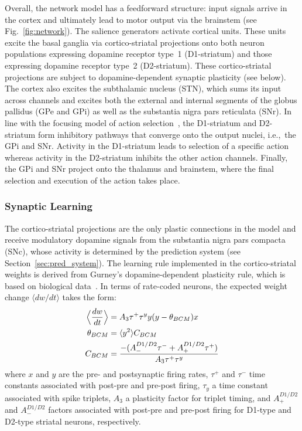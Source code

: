 \documentclass[a4paper]{scrreprt}
\begin{document}
Overall, the network model has a feedforward structure: input signals arrive in the cortex and ultimately lead to motor output via the brainstem (see Fig.~\ref{fig:network}). The salience generators activate cortical units. These units excite the basal ganglia via cortico-striatal projections onto both neuron populations expressing dopamine receptor type~1 (D1-striatum) and those expressing dopamine receptor type~2 (D2-striatum). These cortico-striatal projections are subject to dopamine-dependent synaptic plasticity (see below). The cortex also excites the subthalamic nucleus (STN), which sums its input across channels and excites both the external and internal segments of the globus pallidus (GPe and GPi) as well as the substantia nigra pars reticulata (SNr). In line with the focusing model of action selection~\cite{kandel_basalganglia}, the D1-striatum and D2-striatum form inhibitory pathways that converge onto the output nuclei, i.e.,~the GPi and SNr. Activity in the D1-striatum leads to selection of a specific action whereas activity in the D2-striatum inhibits the other action channels. Finally, the GPi and SNr project onto the thalamus and brainstem, where the final selection and execution of the action takes place.

\subsubsection{Synaptic Learning}

The cortico-striatal projections are the only plastic connections in the model and receive modulatory dopamine signals from the substantia nigra pars compacta (SNc), whose activity is determined by the prediction system (see Section~\ref{sec:pred_system}). The learning rule implemented in the cortico-striatal weights is derived from Gurney's dopamine-dependent plasticity rule, which is based on biological data~\cite{shen08}. In terms of rate-coded neurons, the expected weight change $\langle dw / dt \rangle$ takes the form:
\begin{align}
\Bigl\langle \frac{dw}{dt}\Bigr\rangle &= A_3 \tau^+ \tau^y y(y-\theta_{BCM}) x\\
\theta_{BCM} &= \langle y^2 \rangle C_{BCM} \\
C_{BCM} &= \frac{-(A_-^{D1/D2} \tau^- + A_+^{D1/D2} \tau^+)}{A_3 \tau^+ \tau^y}
\end{align}
where $x$ and $y$ are the pre- and postsynaptic firing rates, $\tau^+$ and $\tau^-$ time constants associated with post-pre and pre-post firing, $\tau_y$ a time constant associated with spike triplets, $A_3$ a plasticity factor for triplet timing, and $A_+^{D1/D2}$ and $A_-^{D1/D2}$ factors associated with post-pre and pre-post firing for D1-type and D2-type striatal neurons, respectively.
\end{document}
